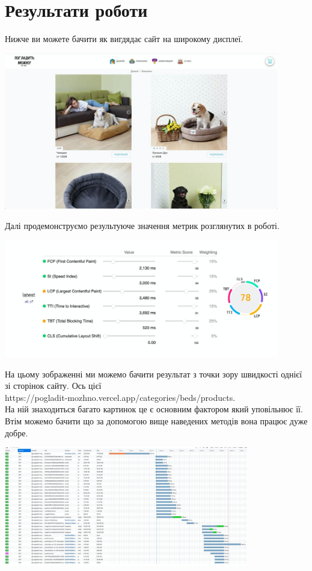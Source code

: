 \newpage
\section{Результати роботи}
Нижче ви можете бачити як вигдядає сайт на широкому дисплеї.

\includegraphics[width=0.9\textwidth]{../site_screenshot.jpg}

Далі продемонструємо результуюче значення метрик розглянутих в роботі.

\includegraphics[width=0.9\textwidth]{../score.jpg}

На цьому зображенні ми можемо бачити результат з точки зору швидкості однієї зі сторінок сайту.
Ось цієї \\ https://pogladit-mozhno.vercel.app/categories/beds/products. \\
На ній знаходиться багато картинок це є основним фактором який уповільнює її.
Втім можемо бачити що за допомогою вище наведених методів вона працює дуже добре.

\includegraphics[width=0.8\textwidth]{../network_spec.jpg}


